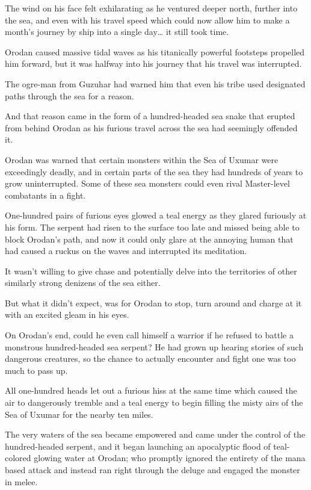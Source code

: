 \documentclass[a4paper,10pt]{book}
\begin{document}
The wind on his face felt exhilarating as he ventured deeper north, further into the sea, and even with his travel speed which could now allow him to make a month’s journey by ship into a single day… it still took time.\par
Orodan caused massive tidal waves as his titanically powerful footsteps propelled him forward, but it was halfway into his journey that his travel was interrupted.\par
The ogre-man from Guzuhar had warned him that even his tribe used designated paths through the sea for a reason.\par
And that reason came in the form of a hundred-headed sea snake that erupted from behind Orodan as his furious travel across the sea had seemingly offended it.\par
Orodan was warned that certain monsters within the Sea of Uxumar were exceedingly deadly, and in certain parts of the sea they had hundreds of years to grow uninterrupted. Some of these sea monsters could even rival Master-level combatants in a fight.\par
One-hundred pairs of furious eyes glowed a teal energy as they glared furiously at his form. The serpent had risen to the surface too late and missed being able to block Orodan’s path, and now it could only glare at the annoying human that had caused a ruckus on the waves and interrupted its meditation.\par
It wasn’t willing to give chase and potentially delve into the territories of other similarly strong denizens of the sea either.\par
But what it didn’t expect, was for Orodan to stop, turn around and charge at it with an excited gleam in his eyes.\par
On Orodan’s end, could he even call himself a warrior if he refused to battle a monstrous hundred-headed sea serpent? He had grown up hearing stories of such dangerous creatures, so the chance to actually encounter and fight one was too much to pass up.\par
All one-hundred heads let out a furious hiss at the same time which caused the air to dangerously tremble and a teal energy to begin filling the misty airs of the Sea of Uxumar for the nearby ten miles.\par
The very waters of the sea became empowered and came under the control of the hundred-headed serpent, and it began launching an apocalyptic flood of teal-colored glowing water at Orodan; who promptly ignored the entirety of the mana based attack and instead ran right through the deluge and engaged the monster in melee.\par
\end{document}
